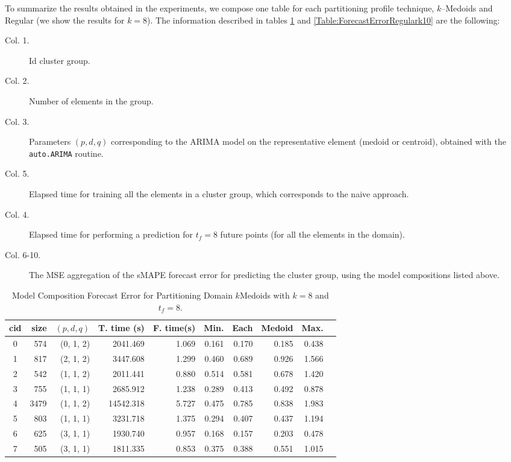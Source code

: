 To summarize the results obtained in the experiments, we compose one table for each partitioning profile technique, $k$--Medoids and Regular (we show the results for $k=8$). The information described in tables \ref{Table:ForecastErrorkMedoidsk8} and \ref{Table:ForecastErrorRegulark10} are the following:

\begin{description}
    \item[Col. 1.] Id cluster group.
    \item[Col. 2.] Number of elements in the group.
    \item[Col. 3.] Parameters $(p, d, q)$ corresponding to the ARIMA model on the representative element (medoid or centroid), obtained with the \texttt{auto.ARIMA} routine.
    \item[Col. 5.] Elapsed time for training all the elements in a cluster group, which corresponds to the naive approach.
    \item[Col. 4.] Elapsed time for performing a prediction for $t_{f}=8$ future points (for all the elements in the domain).
    \item[Col. 6-10.] The MSE aggregation of the sMAPE forecast error for predicting the cluster group, using the model compositions listed above.
\end{description}

\begin{table}[h]
	\centering
	\small
	\begin{tabular}{|c|r|r|r|r|r|r|r|r|r|}
        \hline
        cid & size & $(p, d, q)$ & T. time (s) & F. time(s) & Min. & Each & \cellcolor{red!20}Medoid & Max. \\
        \hline
        0 &  574 & (0, 1, 2) &  2041.469   & 1.069   & 0.161  & 0.170  & \cellcolor{red!20}0.185 & 0.438  \\
        1 &  817 & (2, 1, 2) &  3447.608   & 1.299   & 0.460  & 0.689  & \cellcolor{red!20}0.926 & 1.566  \\
        2 &  542 & (1, 1, 2) &  2011.441   & 0.880   & 0.514  & 0.581  & \cellcolor{red!20}0.678 & 1.420  \\
        3 &  755 & (1, 1, 1) &  2685.912   & 1.238   & 0.289  & 0.413  & \cellcolor{red!20}0.492 & 0.878  \\
        4 & 3479 & (1, 1, 2) & 14542.318   & 5.727   & 0.475  & 0.785  & \cellcolor{red!20}0.838 & 1.983  \\
        5 &  803 & (1, 1, 1) &  3231.718   & 1.375   & 0.294  & 0.407  & \cellcolor{red!20}0.437 & 1.194  \\
        6 &  625 & (3, 1, 1) &  1930.740   & 0.957   & 0.168  & 0.157  & \cellcolor{red!20}0.203 & 0.478  \\
        7 &  505 & (3, 1, 1) &  1811.335   & 0.853   & 0.375  & 0.388  & \cellcolor{red!20}0.551 & 1.015  \\ \hline      
	\end{tabular}
	\caption{Model Composition Forecast Error for Partitioning Domain $k$Medoids with $k=8$ and $t_{f}=8$.}
	\label{Table:ForecastErrorkMedoidsk8}
\end{table}

